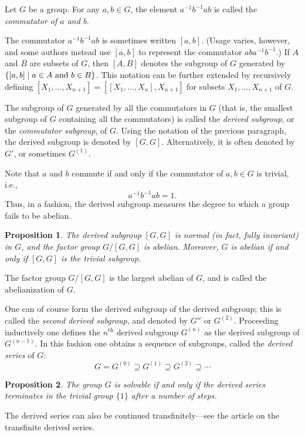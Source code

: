 \documentclass[12pt]{article}
\newcommand{\supth}{^{\text{th}}}
\newtheorem{proposition}{Proposition}
\begin{document}

Let $G$ be a group.
For any $a,b\in G$, the element $a^{-1}b^{-1}ab$ is called the \emph{commutator of $a$ and $b$}.

The commutator $a^{-1}b^{-1}ab$ is sometimes written $[a,b]$.
(Usage varies, however, and some authors instead use $[a,b]$ to represent the commutator $aba^{-1}b^{-1}$.)
If $A$ and $B$ are subsets of $G$, then $[A,B]$ denotes the subgroup of $G$ generated by $\{[a,b]\mid a\in A\hbox{ and }b\in B\}$.
This notation can be further extended by recursively defining
$[X_1,\dots,X_{n+1}]=[[X_1,\dots,X_n],X_{n+1}]$
for subsets $X_1,\dots,X_{n+1}$ of $G$.

The subgroup of $G$ generated by all the commutators in $G$ 
(that is, the smallest subgroup of $G$ containing all the commutators)
is called the \emph{derived subgroup}, 
or the \emph{commutator subgroup}, of $G$.
Using the notation of the previous paragraph, the derived subgroup is denoted by $[G,G]$.
Alternatively, it is often denoted by $G'$, or sometimes $G^{(1)}$.

Note that $a$ and $b$ commute if and only if the commutator of $a,b\in G$ is trivial, i.e.,
\[ a^{-1} b^{-1}a b = 1. \]
Thus, in a fashion, the derived subgroup measures the degree to which a group fails to be abelian.

\begin{proposition}
The derived subgroup $[G,G]$ is normal (in fact, fully invariant) in $G$,
and the factor group $G/[G,G]$ is abelian.  
Moreover, $G$ is abelian if and only if $[G,G]$ is the trivial subgroup.
\end{proposition}

The factor group $G/[G,G]$ is the largest abelian  of $G$,
and is called the abelianization of $G$.

One can of course form the derived subgroup of the derived subgroup;
this is called the \emph{second derived subgroup}, and denoted by $G''$ or $G^{(2)}$. Proceeding inductively one defines the $n\supth$ derived
subgroup $G^{(n)}$ as the derived subgroup of $G^{(n-1)}$. In this fashion one
obtains a sequence of subgroups, called the \emph{derived series} of $G$:
$$G=G^{(0)} \supseteq G^{(1)} \supseteq G^{(2)} \supseteq \cdots$$

\begin{proposition}
The group $G$ is solvable if and only if the derived series
terminates in the trivial group $\{ 1 \}$ after a  number of steps.
\end{proposition}

The derived series can also be continued transfinitely---see the article on the transfinite derived series.
\end{document}
